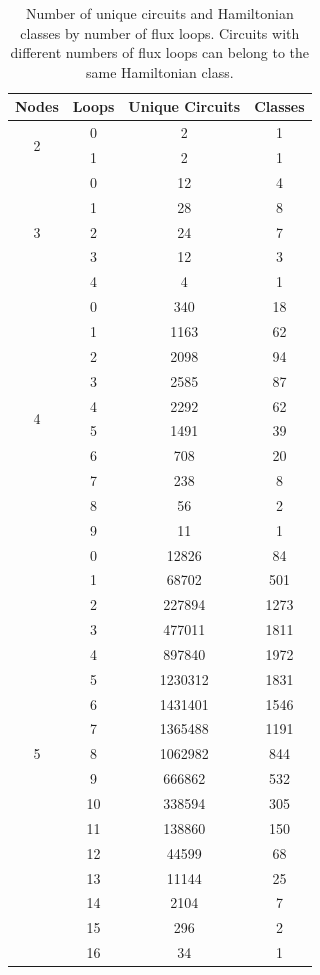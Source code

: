 \begin{table}[htbp]
\centering
\setlength{\tabcolsep}{13pt}
\renewcommand{\arraystretch}{1.1}
\begin{tabular}{cccc}
\toprule
Nodes & Loops & Unique Circuits & Classes \\ \toprule
\multirow{2}{*}{2}& 0 & 2 & 1 \\
& 1 & 2 & 1 \\
\midrule
\multirow{5}{*}{3}& 0 & 12 & 4 \\
& 1 & 28 & 8 \\
& 2 & 24 & 7 \\
& 3 & 12 & 3 \\
& 4 & 4 & 1 \\
\midrule
\multirow{10}{*}{4}& 0 & 340 & 18 \\
& 1 & 1163 & 62 \\
& 2 & 2098 & 94 \\
& 3 & 2585 & 87 \\
& 4 & 2292 & 62 \\
& 5 & 1491 & 39 \\
& 6 & 708 & 20 \\
& 7 & 238 & 8 \\
& 8 & 56 & 2 \\
& 9 & 11 & 1 \\
\midrule
\multirow{17}{*}{5}& 0 & 12826 & 84 \\
& 1 & 68702 & 501 \\
& 2 & 227894 & 1273 \\
& 3 & 477011 & 1811 \\
& 4 & 897840 & 1972 \\
& 5 & 1230312 & 1831 \\
& 6 & 1431401 & 1546 \\
& 7 & 1365488 & 1191 \\
& 8 & 1062982 & 844 \\
& 9 & 666862 & 532 \\
& 10 & 338594 & 305 \\
& 11 & 138860 & 150 \\
& 12 & 44599 & 68 \\
& 13 & 11144 & 25 \\
& 14 & 2104 & 7 \\
& 15 & 296 & 2 \\
& 16 & 34 & 1 \\
\bottomrule
\end{tabular}
\caption{Number of unique circuits and Hamiltonian classes by number of flux loops. Circuits with different numbers of flux loops can belong to the same Hamiltonian class.}
    \label{tab:granular_overview2}
\end{table}

